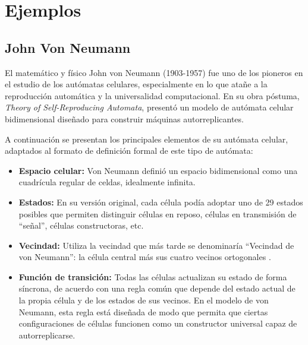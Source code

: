 \section{Ejemplos}

\subsection{John Von Neumann}

El matemático y físico John von Neumann (1903-1957) fue uno de los pioneros en el estudio de los autómatas celulares, especialmente en lo que atañe a la reproducción automática y la universalidad computacional. En su obra póstuma, \textit{Theory of Self-Reproducing Automata}, presentó un modelo de autómata celular bidimensional diseñado para construir máquinas autorreplicantes. 

A continuación se presentan los principales elementos de su autómata celular, adaptados al formato de definición formal de este tipo de autómata:

\begin{itemize}
	
	\item \textbf{Espacio celular:} Von Neumann definió un espacio bidimensional como una cuadrícula regular de celdas, idealmente infinita.
	
	
	
	\item \textbf{Estados:} En su versión original, cada célula podía adoptar uno de 29 estados posibles que permiten distinguir células en reposo, células en transmisión de “señal”, células constructoras, etc. 
	
	
	
	\item \textbf{Vecindad:} Utiliza la vecindad que más tarde se denominaría ``Vecindad de von Neumann'': la célula central más sus cuatro vecinos ortogonales \cite{vonNeumannNeighborhood}.
	
	
	
	\item \textbf{Función de transición:} Todas las células actualizan su estado de forma síncrona, de acuerdo con una regla común que depende del estado actual de la propia célula y de los estados de sus vecinos. En el modelo de von Neumann, esta regla está diseñada de modo que permita que ciertas configuraciones de células funcionen como un constructor universal capaz de autorreplicarse.
	
\end{itemize}

